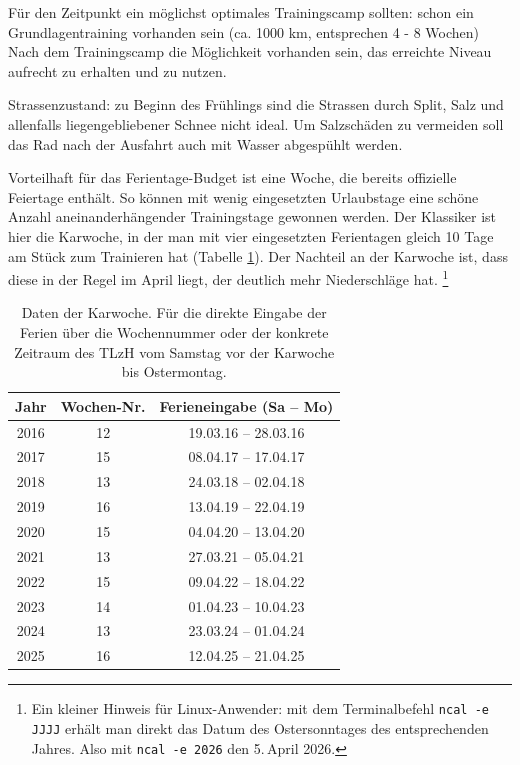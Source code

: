\documentclass[a4paper,DIV13,BCOR0cm]{scrartcl}
\newcommand{\tlzh}{TLzH}
\begin{document}
Für den Zeitpunkt ein möglichst optimales Trainingscamp sollten:
schon ein Grundlagentraining vorhanden sein (ca. 1000 km, entsprechen 4 - 8 Wochen)
Nach dem Trainingscamp die Möglichkeit vorhanden sein, das erreichte Niveau aufrecht zu erhalten und zu nutzen.

Strassenzustand:
zu Beginn des Frühlings sind die Strassen durch Split, Salz und allenfalls liegengebliebener Schnee nicht ideal.
Um Salzschäden zu vermeiden soll das Rad nach der Ausfahrt auch mit Wasser abgespühlt werden.

Vorteilhaft für das Ferientage-Budget ist eine Woche,
die bereits offizielle Feiertage enthält.
So können mit wenig eingesetzten Urlaubstage eine schöne Anzahl
aneinanderhängender Trainingstage gewonnen werden.
Der Klassiker ist hier die Karwoche,
in der man mit vier eingesetzten Ferientagen gleich 10 Tage am Stück zum Trainieren hat
(Tabelle \ref{tab:karwoche}).
Der Nachteil an der Karwoche ist, dass diese in der Regel im April liegt,
der deutlich mehr Niederschläge hat.
\footnote{Ein kleiner Hinweis für Linux-Anwender:
mit dem Terminalbefehl \texttt{ncal -e JJJJ} erhält man direkt das
Datum des Ostersonntages des entsprechenden Jahres. Also mit \texttt{ncal -e 2026}
den 5.\,April 2026.}

\begin{table}
        \centering
        \begin{tabular}{ccc}
                \toprule
                    Jahr & Wochen-Nr. & Ferieneingabe (Sa -- Mo)\\
                \midrule
                    2016 & 12 & 19.03.16 -- 28.03.16 \\
                    2017 & 15 & 08.04.17 -- 17.04.17 \\
                    2018 & 13 & 24.03.18 -- 02.04.18 \\
                    2019 & 16 & 13.04.19 -- 22.04.19 \\
                    2020 & 15 & 04.04.20 -- 13.04.20 \\
                    2021 & 13 & 27.03.21 -- 05.04.21 \\
                    2022 & 15 & 09.04.22 -- 18.04.22 \\
                    2023 & 14 & 01.04.23 -- 10.04.23 \\
                    2024 & 13 & 23.03.24 -- 01.04.24 \\
                    2025 & 16 & 12.04.25 -- 21.04.25 \\
                \bottomrule
        \end{tabular}
        \caption{Daten der Karwoche.
            Für die direkte Eingabe der Ferien über die Wochennummer oder
            der konkrete Zeitraum des \tlzh{} vom Samstag vor der Karwoche bis Ostermontag.}
        \label{tab:karwoche}
\end{table}
\end{document}
